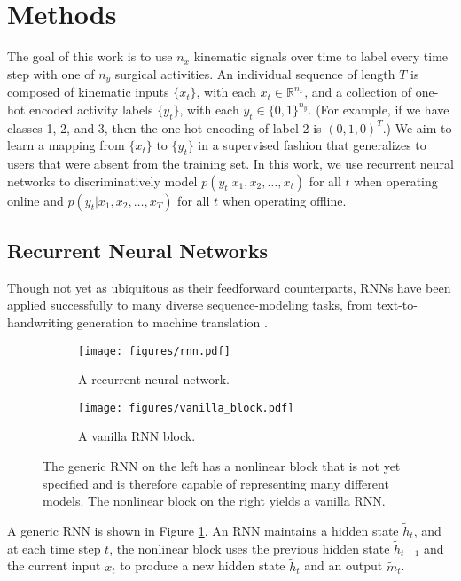 \documentclass{llncs}
\begin{document}
\section{Methods}\label{sec:methods}

The goal of this work is to use $n_x$ kinematic signals over time to label every time step with one of $n_y$ surgical activities. An individual sequence of length $T$ is composed of kinematic inputs $\{x_t\}$, with each $x_t \in \mathbb{R}^{n_x}$, and a collection of one-hot encoded activity labels $\{y_t\}$, with each $y_t \in \{0, 1\}^{n_y}$. (For example, if we have classes 1, 2, and 3, then the one-hot encoding of label 2 is $(0, 1, 0)^T$.) We aim to learn a mapping from $\{x_t\}$ to $\{y_t\}$ in a supervised fashion that generalizes to users that were absent from the training set. In this work, we use recurrent neural networks to discriminatively model $p(y_t | x_1, x_2, \ldots, x_t)$ for all $t$ when operating online and $p(y_t | x_1, x_2, \ldots, x_T)$ for all $t$ when operating offline.

\subsection{Recurrent Neural Networks}

Though not yet as ubiquitous as their feedforward counterparts, RNNs have been applied successfully to many diverse sequence-modeling tasks, from text-to-handwriting generation \cite{graves2013generating} to machine translation \cite{sutskever2014sequence}.
\begin{figure}[t]
	\centering
	\begin{subfigure}[b]{0.55\textwidth}
		\centering
		\texttt{[image: figures/rnn.pdf]}
		\caption{A recurrent neural network.}
		\label{fig:rnn}
	\end{subfigure}
	\hfill
	\begin{subfigure}[b]{0.44\textwidth}
		\centering
		\texttt{[image: figures/vanilla\_block.pdf]}
		\caption{A vanilla RNN block.}
		\label{fig:vanillablock}
	\end{subfigure}
	\caption{The generic RNN on the left has a nonlinear block that is not yet specified and is therefore capable of representing many different models. The nonlinear block on the right yields a vanilla RNN.}
	\label{fig:rnnvanillablock}
\end{figure}

A generic RNN is shown in Figure \ref{fig:rnn}. An RNN maintains a hidden state $\tilde{h}_t$, and at each time step $t$, the nonlinear block uses the previous hidden state $\tilde{h}_{t-1}$ and the current input $x_t$ to produce a new hidden state $\tilde{h}_t$ and an output $\tilde{m}_t$.
\end{document}
